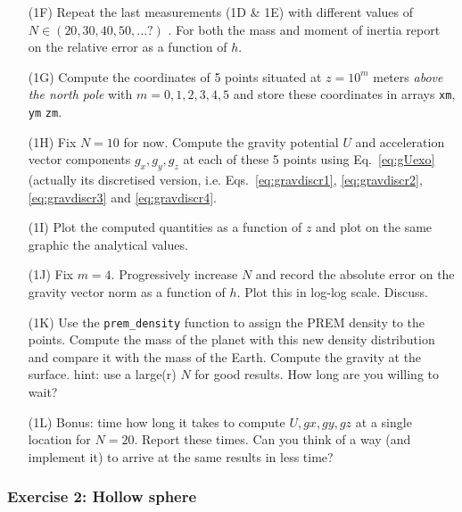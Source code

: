 \begin{itemize}

\item[(1F)] Repeat the last measurements (1D \& 1E) with different values of $N\in(20,30,40,50,...?)$ .
For both the mass and moment of inertia report on the relative error as a function of $h$.

\item[(1G)] Compute the coordinates of 5 points situated at $z=10^m$ meters 
{\it above the north pole} with $m=0,1,2,3,4,5$ and 
store these coordinates in arrays {\tt xm}, {\tt ym} {\tt zm}. 

\item[(1H)] Fix $N=10$ for now. Compute the gravity potential $U$ and acceleration vector 
components $g_x,g_y,g_z$ at each of these 5 points using Eq.~\eqref{eq:gUexo} (actually its 
discretised version, i.e. Eqs.~\eqref{eq:gravdiscr1}, \eqref{eq:gravdiscr2}, 
\eqref{eq:gravdiscr3} and \eqref{eq:gravdiscr4}.
 
\item[(1I)] Plot the computed quantities as a function of $z$ and plot on 
the same graphic the analytical values. 

\item[(1J)] Fix $m=4$. Progressively increase $N$ and record the absolute error on the gravity vector norm 
as a function of $h$. Plot this in log-log scale. Discuss.

\item[(1K)] Use the {\tt prem\_density} function to assign the PREM \cite{dzan81} density to the points. 
Compute the mass of the planet with this 
new density distribution and compare it with the mass of the Earth. Compute the gravity at the surface.
hint: use a large(r) $N$ for good results. How long are you willing to wait? 

\item[(1L)] Bonus: time how long it takes to compute $U,gx,gy,gz$ at a single location for $N=20$. Report these times. 
Can you think of a way (and implement it) to arrive at the same results in less time?  

\end{itemize}

\subsubsection*{Exercise 2: Hollow sphere}

